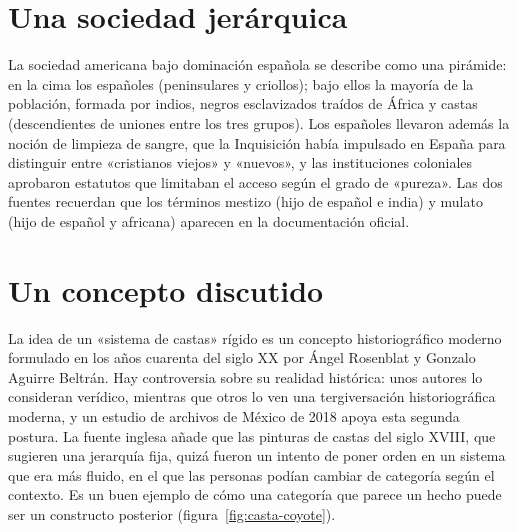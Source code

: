 \documentclass{book}
\begin{document}

\section{Una sociedad jerárquica}

La sociedad americana bajo dominación española se describe como una pirámide: en la cima los españoles (peninsulares y criollos); bajo ellos la mayoría de la población, formada por indios, negros esclavizados traídos de África y castas (descendientes de uniones entre los tres grupos). Los españoles llevaron además la noción de limpieza de sangre, que la Inquisición había impulsado en España para distinguir entre «cristianos viejos» y «nuevos», y las instituciones coloniales aprobaron estatutos que limitaban el acceso según el grado de «pureza». Las dos fuentes recuerdan que los términos mestizo (hijo de español e india) y mulato (hijo de español y africana) aparecen en la documentación oficial.


\section{Un concepto discutido}

La idea de un «sistema de castas» rígido es un concepto historiográfico moderno formulado en los años cuarenta del siglo XX por Ángel Rosenblat y Gonzalo Aguirre Beltrán. Hay controversia sobre su realidad histórica: unos autores lo consideran verídico, mientras que otros lo ven una tergiversación historiográfica moderna, y un estudio de archivos de México de 2018 apoya esta segunda postura. La fuente inglesa añade que las pinturas de castas del siglo XVIII, que sugieren una jerarquía fija, quizá fueron un intento de poner orden en un sistema que era más fluido, en el que las personas podían cambiar de categoría según el contexto. Es un buen ejemplo de cómo una categoría que parece un hecho puede ser un constructo posterior (figura~\ref{fig:casta-coyote}).

\end{document}
